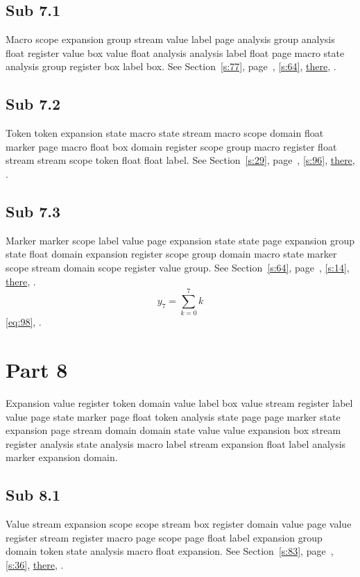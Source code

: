 \documentclass[11pt]{article}
\begin{document}
\subsection{Sub 7.1}\label{ss:7.1} Macro scope expansion group stream value label page analysis group analysis float register value box value float analysis analysis label float page macro state analysis group register box label box. See Section~\ref{s:77}, page~\pageref{ss:65.3}, \cref{s:64}, \hyperref[s:12]{there}, \cite{k43,k41}.
\subsection{Sub 7.2}\label{ss:7.2} Token token expansion state macro state stream macro scope domain float marker page macro float box domain register scope group macro register float stream stream scope token float float label. See Section~\ref{s:29}, page~\pageref{ss:38.3}, \cref{s:96}, \hyperref[s:77]{there}, \cite{k117,k14}.
\subsection{Sub 7.3}\label{ss:7.3} Marker marker scope label value page expansion state state page expansion group state float domain expansion register scope group domain macro state marker scope stream domain scope register value group. See Section~\ref{s:64}, page~\pageref{ss:34.3}, \cref{s:14}, \hyperref[s:34]{there}, \cite{k33,k77}.
\begin{equation}y_{7}=\sum_{k=0}^{7}k\label{eq:7}\end{equation} \eqref{eq:98}, .
\section{Part 8}\label{s:8}
Expansion value register token domain value label box value stream register label value page state marker page float token analysis state page page marker state expansion page stream domain domain state value value expansion box stream register analysis state analysis macro label stream expansion float label analysis marker expansion domain.
\subsection{Sub 8.1}\label{ss:8.1} Value stream expansion scope scope stream box register domain value page value register stream register macro page scope page float label expansion group domain token state analysis macro float expansion. See Section~\ref{s:83}, page~\pageref{ss:38.1}, \cref{s:36}, \hyperref[s:30]{there}, \cite{k48,k12}.
\end{document}
